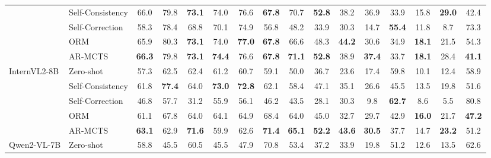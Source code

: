 \begin{table}[t]
{\begin{tabular}{llcccccccccccccc}
            & Self-Consistency & 66.0 & 79.8 & \textbf{73.1} & 74.0 & 76.6 & \textbf{67.8} & 70.7 & \textbf{52.8} & 38.2 & 36.9 & 33.9 & 15.8 & \textbf{29.0} & 42.4 \\
            & Self-Correction & 58.3 & 78.4 & 68.8 & 70.1 & 74.9 & 56.8 & 48.2 & 33.9 & 30.3 & 14.7 & \textbf{55.4} & 11.8 & 8.7 & 73.3 \\
            & ORM & 65.9 & 80.3 & \textbf{73.1} & 74.0 & \textbf{77.0} & \textbf{67.8} & 66.6 & 48.3 & \textbf{44.2} & 30.6 & 34.9 & \textbf{18.1} & 21.5 & 54.3 \\
            & \cellcolor{gray!15}AR-MCTS & \cellcolor{gray!15}\textbf{66.3} & \cellcolor{gray!15}79.8 & \cellcolor{gray!15}\textbf{73.1} & \cellcolor{gray!15}\textbf{74.4} & \cellcolor{gray!15}76.6 & \cellcolor{gray!15}\textbf{67.8} & \cellcolor{gray!15}\textbf{71.1} & \cellcolor{gray!15}\textbf{52.8} & \cellcolor{gray!15}38.9 & \cellcolor{gray!15}\textbf{37.4} & \cellcolor{gray!15}33.7 & \cellcolor{gray!15}\textbf{18.1} & \cellcolor{gray!15}28.4 & \cellcolor{gray!15}\textbf{41.1} \\
            \midrule
            \multirow{5}{*}{InternVL2-8B}
            & Zero-shot & 57.3 & 62.5 & 62.4 & 61.2 & 60.7 & 59.1 & 50.0 & 36.7 & 23.6 & 17.4 & 59.8 & 10.1 & 12.4 & 58.9 \\
            & Self-Consistency & 61.8 & \textbf{77.4} & 64.0 & \textbf{73.0} & \textbf{72.8} & 62.1 & 58.4 & 47.1 & 35.1 & 26.6 & 45.5 & 13.5 & 19.8 & 51.6 \\
            & Self-Correction & 46.8 & 57.7 & 31.2 & 55.9 & 56.1 & 46.2 & 43.5 & 28.1 & 30.3 & 9.8 & \textbf{62.7} & 8.6 & 5.5 & 80.8 \\
            & ORM & 61.1 & 67.8 & 64.0 & 64.1 & 64.9 & 68.4 & 64.0 & 45.0 & 32.7 & 29.7 & 42.9 & \textbf{16.0} & 21.7 & \textbf{47.2} \\
            & \cellcolor{gray!15}AR-MCTS & \cellcolor{gray!15}\textbf{63.1} & \cellcolor{gray!15}62.9 & \cellcolor{gray!15}\textbf{71.6} & \cellcolor{gray!15}59.9 & \cellcolor{gray!15}62.6 & \cellcolor{gray!15}\textbf{71.4} & \cellcolor{gray!15}\textbf{65.1} & \cellcolor{gray!15}\textbf{52.2} & \cellcolor{gray!15}\textbf{43.6} & \cellcolor{gray!15}\textbf{30.5} & \cellcolor{gray!15}37.7 & \cellcolor{gray!15}14.7 & \cellcolor{gray!15}\textbf{23.2} & \cellcolor{gray!15}51.2 \\
            \midrule
            \multirow{5}{*}{Qwen2-VL-7B}
            & Zero-shot & 58.8 & 45.5 & 60.5 & 45.5 & 47.9 & 70.8 & 53.4 & 37.2 & 33.9 & 19.8 & 51.2 & 12.6 & 13.5 & 62.6 \\

\end{tabular}}
\end{table}
